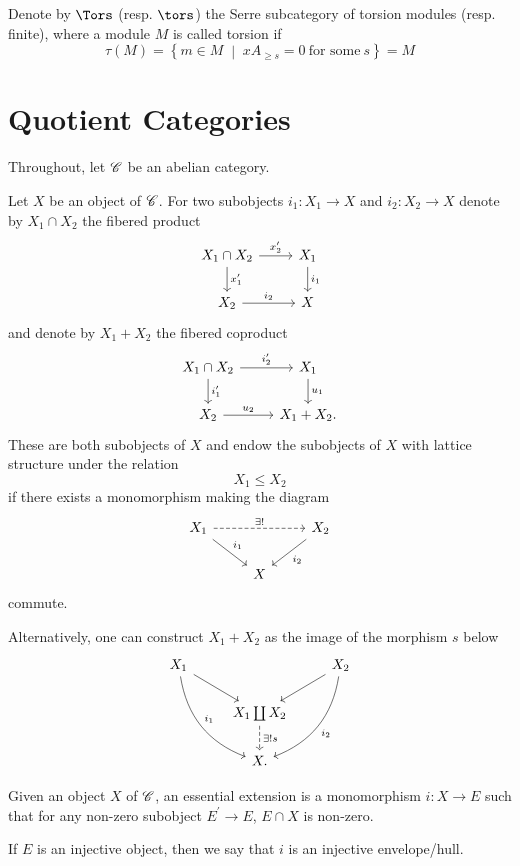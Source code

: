 \documentclass[10pt]{amsart}
\begin{document}
Denote by $\Tors$ (resp. $\tors$) the Serre subcategory of torsion modules (resp. finite), where a module $M$ is called torsion if
$$\tau(M) = \left\{m \in M \;\middle\vert\; xA_{\geq s} = 0\ \text{for some}\ s\right\} = M$$

\section{Quotient Categories}
Throughout, let $\mathscr{C}$ be an abelian category.

\begin{defn}
  Let $X$ be an object of $\mathscr{C}$.
  For two subobjects $i_1 \colon X_1 \rightarrow X$ and $i_2 \colon X_2 \rightarrow X$ denote by $X_1 \cap X_2$ the fibered product
  $$\begin{tikzcd}
    X_1 \cap X_2 \arrow{d}{x_1^\prime}\arrow{r}{x_2^\prime} & X_1\arrow{d}{i_1}\\
    X_2 \arrow{r}{i_2} & X
  \end{tikzcd}$$
  and denote by $X_1 + X_2$ the fibered coproduct 
  $$\begin{tikzcd}
    X_1 \cap X_2 \arrow{r}{i_2^\prime} \arrow{d}{i_1^\prime} & X_1\arrow{d}{u_1}\\
    X_2 \arrow{r}{u_2} & X_1 + X_2.
  \end{tikzcd}$$
  These are both subobjects of $X$ and endow the subobjects of $X$ with lattice structure under the relation
  $$X_1 \leq X_2$$
  if there exists a monomorphism making the diagram
  $$\begin{tikzcd}
    X_1\arrow{rd}{i_1}\arrow[dashed]{rr}{\exists !} & & X_2 \arrow{ld}{i_2}\\
    & X &
  \end{tikzcd}$$
  commute.
\end{defn}

\begin{rmk}
  Alternatively, one can construct $X_1 + X_2$ as the image of the morphism $s$ below
  $$\begin{tikzcd}
    X_1\arrow[bend right]{rdd}{i_1}\arrow{rd} & & X_2 \arrow{ld} \arrow[bend left]{ldd}{i_2}\\
    & X_1 \coprod X_2\arrow[dashed]{d}{\exists !s} &\\
    & X. &
  \end{tikzcd}$$
\end{rmk}

\begin{defn}
  Given an object $X$ of $\mathscr{C}$, an essential extension is a monomorphism $i \colon X \rightarrow E$ such that for any non-zero subobject $E^\prime \rightarrow E$, $E \cap X$ is non-zero.
  
  If $E$ is an injective object, then we say that $i$ is an injective envelope/hull.
\end{defn}
\end{document}
